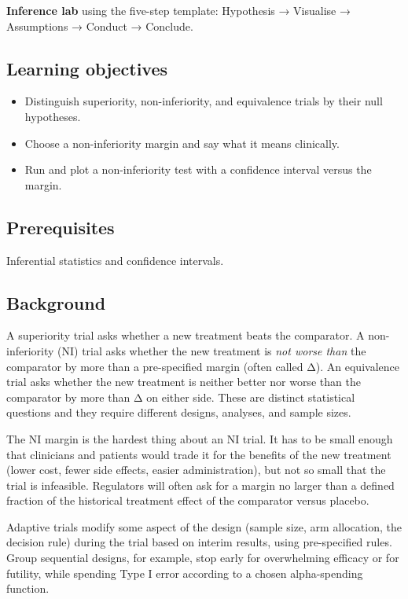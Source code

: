 \documentclass[
]{article}
\author{}
\date{\vspace{-2.5em}}
\providecommand{\tightlist}{%
  \setlength{\itemsep}{0pt}\setlength{\parskip}{0pt}}
\begin{document}
\textbf{Inference lab} using the five-step template: Hypothesis →
Visualise → Assumptions → Conduct → Conclude.

\subsection{Learning objectives}\label{learning-objectives}

\begin{itemize}
\tightlist
\item
  Distinguish superiority, non-inferiority, and equivalence trials by
  their null hypotheses.
\item
  Choose a non-inferiority margin and say what it means clinically.
\item
  Run and plot a non-inferiority test with a confidence interval versus
  the margin.
\end{itemize}

\subsection{Prerequisites}\label{prerequisites}

Inferential statistics and confidence intervals.

\subsection{Background}\label{background}

A superiority trial asks whether a new treatment beats the comparator. A
non-inferiority (NI) trial asks whether the new treatment is \emph{not
worse than} the comparator by more than a pre-specified margin (often
called Δ). An equivalence trial asks whether the new treatment is
neither better nor worse than the comparator by more than Δ on either
side. These are distinct statistical questions and they require
different designs, analyses, and sample sizes.

The NI margin is the hardest thing about an NI trial. It has to be small
enough that clinicians and patients would trade it for the benefits of
the new treatment (lower cost, fewer side effects, easier
administration), but not so small that the trial is infeasible.
Regulators will often ask for a margin no larger than a defined fraction
of the historical treatment effect of the comparator versus placebo.

Adaptive trials modify some aspect of the design (sample size, arm
allocation, the decision rule) during the trial based on interim
results, using pre-specified rules. Group sequential designs, for
example, stop early for overwhelming efficacy or for futility, while
spending Type I error according to a chosen alpha-spending function.
\end{document}
